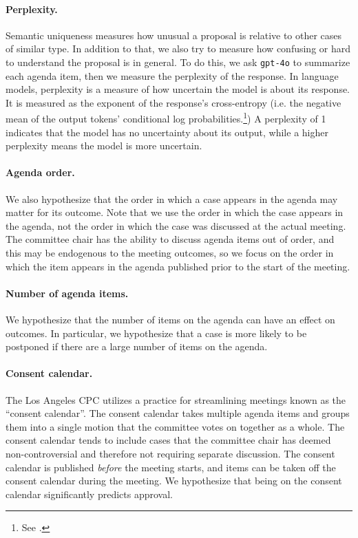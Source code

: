 \paragraph{Perplexity.} Semantic uniqueness measures how unusual a proposal is relative to other cases of similar type. In addition to that, we also try to measure how confusing or hard to understand the proposal is in general. To do this, we ask \texttt{gpt-4o} to summarize each agenda item, then we measure the perplexity of the response. In language models, perplexity is a measure of how uncertain the model is about its response. It is measured as the exponent of the response's cross-entropy  (i.e. the negative mean of the output tokens' conditional log probabilities.\footnote{See \citet{jm2}.}) A perplexity of 1 indicates that the model has no uncertainty about its output, while a higher perplexity means the model is more uncertain. 

\paragraph{Agenda order.} We also hypothesize that the order in which a case appears in the agenda may matter for its outcome. Note that we use the order in which the case appears in the agenda, not the order in which the case was discussed at the actual meeting. The committee chair has the ability to discuss agenda items out of order, and this may be endogenous to the meeting outcomes, so we focus on the order in which the item appears in the agenda published prior to the start of the meeting.

\paragraph{Number of agenda items.} We hypothesize that the number of items on the agenda can have an effect on outcomes. In particular, we hypothesize that a case is more likely to be postponed if there are a large number of items on the agenda.

\paragraph{Consent calendar.} The Los Angeles CPC utilizes a practice for streamlining meetings known as the ``consent calendar''. The consent calendar takes multiple agenda items and groups them into a single motion that the committee votes on together as a whole. The consent calendar tends to include cases that the committee chair has deemed non-controversial and therefore not requiring separate discussion. The consent calendar is published \emph{before} the meeting starts, and items can be taken off the consent calendar during the meeting. We hypothesize that being on the consent calendar significantly predicts approval.


